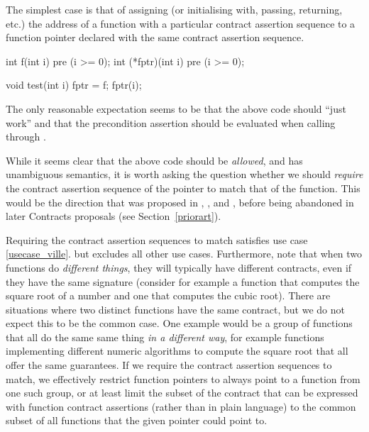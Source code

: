 The simplest case is that of assigning (or initialising with, passing, returning, etc.) the address of a function with a particular contract assertion sequence to a function pointer declared with the same contract assertion sequence. 
\begin{codeblock}
int f(int i) pre (i >= 0);
int (*fptr)(int i) pre (i >= 0);

void test(int i) {
  fptr = f; 
  fptr(i); 
}
\end{codeblock}
The only reasonable expectation seems to be that the above code should ``just work'' and that the precondition assertion  should be evaluated when calling  through .

While it seems clear that the above code should be \emph{allowed}, and has unambiguous semantics, it is worth asking the question whether we should \emph{require} the contract assertion sequence of the pointer to match that of the function. This would be the direction that was proposed in \cite{N4415}, \cite{P0287R0}, and \cite{P0380R0}, before being abandoned in later Contracts proposals (see Section~\ref{priorart}).

Requiring the contract assertion sequences to match satisfies use case \ref{usecase_ville}. but excludes all other use cases. Furthermore, note that when two functions do \emph{different things}, they will typically have different contracts, even if they have the same signature (consider for example a function that computes the square root of a number and one that computes the cubic root). There are situations where two distinct functions have the same contract, but we do not expect this to be the common case. One example would be a group of functions that all do the same same thing \emph{in a different way}, for example functions implementing different numeric algorithms to compute the square root that all offer the same guarantees. If we require the contract assertion sequences to match, we effectively restrict function pointers to always point to a function from one such group, or at least limit the subset of the contract that can be expressed with function contract assertions (rather than in plain language) to the common subset of all functions that the given pointer could point to.


